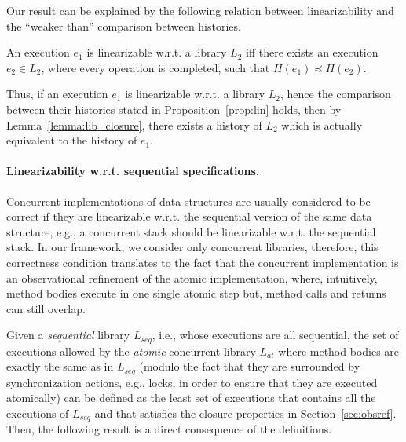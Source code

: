 Our result can be explained by the following relation between linearizability
and the ``weaker than'' comparison between histories.

\begin{proposition}
  \label{prop:lin}

  An execution $e_1$ is linearizable w.r.t. a library $L_2$ iff there exists an
  execution $e_2\in L_2$, where every operation is completed, such that
  $H(e_1)\preceq H(e_2)$.

\end{proposition}


Thus, if an execution $e_1$ is linearizable w.r.t. a library $L_2$, hence the
comparison between their histories stated in Proposition~\ref{prop:lin} holds,
then by Lemma~\ref{lemma:lib_closure}, there exists a history of $L_2$ which is
actually equivalent to the history of $e_1$.

\paragraph{Linearizability w.r.t. sequential specifications.}

Concurrent implementations of data structures are usually considered to be
correct if they are linearizable w.r.t. the sequential version of the same data
structure, e.g., a concurrent stack should be linearizable w.r.t. the
sequential stack. In our framework, we consider only concurrent libraries,
therefore, this correctness condition translates to the fact that the
concurrent implementation is an observational refinement of the atomic
implementation, where, intuitively, method bodies execute in one single atomic
step but, method calls and returns can still overlap.

Given a \emph{sequential} library $L_{seq}$, i.e., whose executions are all
sequential, the set of executions allowed by the \emph{atomic} concurrent
library $L_{at}$ where method bodies are exactly the same as in $L_{seq}$
(modulo the fact that they are surrounded by synchronization actions, e.g.,
locks, in order to ensure that they are executed atomically) can be defined as
the least set of executions that contains all the executions of $L_{seq}$ and
that satisfies the closure properties in Section~\ref{sec:obsref}. Then, the
following result is a direct consequence of the definitions.

